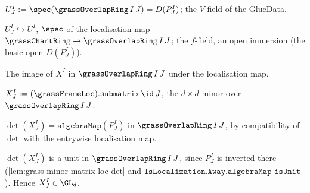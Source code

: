 \begin{definition}
  \label{def:grass-overlap}
  $U^I_J := \spec(\grassOverlapRing\,I\,J) = D(P^I_J)$; the $V$-field of the
  GlueData.
\end{definition}

\begin{definition}
  \label{def:grass-inclusion}
  $U^I_J\hookrightarrow U^I$, $\spec$ of the localisation map
  $\grassChartRing\to\grassOverlapRing\,I\,J$; the $f$-field, an open immersion
  (the basic open $D(P^I_J)$).
\end{definition}

\begin{definition}
  \label{def:grass-frame-loc}
  The image of $X^I$ in $\grassOverlapRing\,I\,J$ under the localisation map.
\end{definition}

\begin{definition}
  \label{def:grass-minor-matrix-loc}
  $X^I_J := (\grassFrameLoc).\mathtt{submatrix}\,\id\,J$, the $d\times d$ minor
  over $\grassOverlapRing\,I\,J$.
\end{definition}

\begin{lemma}
  \label{lem:grass-minor-matrix-loc-det}
  $\det(X^I_J) = \mathtt{algebraMap}(P^I_J)$ in $\grassOverlapRing\,I\,J$,
  by compatibility of $\det$ with the entrywise localisation map.
\end{lemma}

\begin{lemma}
  \label{lem:grass-minor-matrix-loc-isunit-det}
  $\det(X^I_J)$ is a unit in $\grassOverlapRing\,I\,J$, since $P^I_J$ is
  inverted there (\cref{lem:grass-minor-matrix-loc-det} and
  $\mathtt{IsLocalization.Away.algebraMap\_isUnit}$). Hence $X^I_J\in\GL_d$.
\end{lemma}

